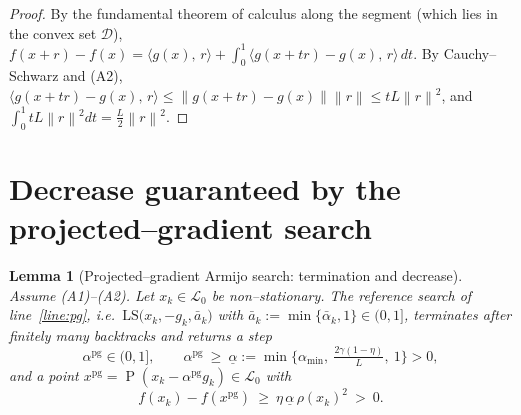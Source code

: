\documentclass[12pt]{article}
\newtheorem{lemma}{Lemma}
\DeclareMathOperator{\proj}{P}
\newcommand{\norm}[1]{\left\lVert #1 \right\rVert}
\newcommand{\inner}[2]{\langle #1,\, #2\rangle}
\begin{document}
\begin{proof}
By the fundamental theorem of calculus along the segment (which lies in the
convex set $\mathcal D$),
$f(x+r)-f(x)=\inner{g(x)}{r}+\int_0^1\inner{g(x+tr)-g(x)}{r}\,dt$. By
Cauchy--Schwarz and (A2),
$\inner{g(x+tr)-g(x)}{r}\le\norm{g(x+tr)-g(x)}\norm{r}\le tL\norm{r}^2$, and
$\int_0^1 tL\norm{r}^2dt=\tfrac{L}{2}\norm{r}^2$.
\end{proof}

\section{Decrease guaranteed by the projected--gradient search}

\begin{lemma}[Projected--gradient Armijo search: termination and decrease]
\label{lem:pg}
Assume (A1)--(A2). Let $x_k\in\mathcal L_0$ be non--stationary. The reference
search of line~\ref{line:pg}, i.e.\ $\mathrm{LS}\big(x_k,-g_k,\bar a_k\big)$ with
$\bar a_k:=\min\{\bar\alpha_k,1\}\in(0,1]$, terminates after finitely many
backtracks and returns a step
\begin{equation}\label{eq:steplb}
\alpha^{\mathrm{pg}}\in(0,1],\qquad
\alpha^{\mathrm{pg}}\ \ge\ \underline\alpha:=
\min\Big\{\alpha_{\min},\ \tfrac{2\gamma(1-\eta)}{L},\ 1\Big\}>0,
\end{equation}
and a point $x^{\mathrm{pg}}=\proj(x_k-\alpha^{\mathrm{pg}}g_k)\in\mathcal L_0$
with
\begin{equation}\label{eq:pg-dec}
f(x_k)-f(x^{\mathrm{pg}})\ \ge\ \eta\,\underline\alpha\,\rho(x_k)^2\ >\ 0 .
\end{equation}
\end{lemma}
\end{document}
